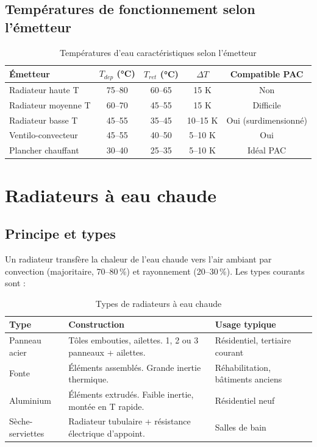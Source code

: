 \subsection{Températures de fonctionnement selon l'émetteur}

\begin{table}[H]
  \centering
  \caption{Températures d'eau caractéristiques selon l'émetteur}
  \begin{tabular}{lcccc}
    \toprule
    Émetteur & $T_{dep}$ (°C) & $T_{ret}$ (°C) & $\Delta T$ & Compatible PAC \\
    \midrule
    Radiateur haute T & 75–80 & 60–65 & 15 K & Non \\
    Radiateur moyenne T & 60–70 & 45–55 & 15 K & Difficile \\
    Radiateur basse T & 45–55 & 35–45 & 10–15 K & Oui (surdimensionné) \\
    Ventilo-convecteur & 45–55 & 40–50 & 5–10 K & Oui \\
    Plancher chauffant & 30–40 & 25–35 & 5–10 K & Idéal PAC \\
    \bottomrule
  \end{tabular}
\end{table}

\section{Radiateurs à eau chaude}

\subsection{Principe et types}

Un radiateur transfère la chaleur de l'eau chaude vers l'air ambiant par convection (majoritaire, 70--80\,\%) et rayonnement (20--30\,\%). Les types courants sont :

\begin{table}[H]
  \centering
  \caption{Types de radiateurs à eau chaude}
  \begin{tabular}{p{3cm}p{4.5cm}p{4cm}}
    \toprule
    Type & Construction & Usage typique \\
    \midrule
    Panneau acier & Tôles embouties, ailettes. 1, 2 ou 3 panneaux + ailettes. & Résidentiel, tertiaire courant \\
    Fonte & Éléments assemblés. Grande inertie thermique. & Réhabilitation, bâtiments anciens \\
    Aluminium & Éléments extrudés. Faible inertie, montée en T rapide. & Résidentiel neuf \\
    Sèche-serviettes & Radiateur tubulaire + résistance électrique d'appoint. & Salles de bain \\
    \bottomrule
  \end{tabular}
\end{table}


